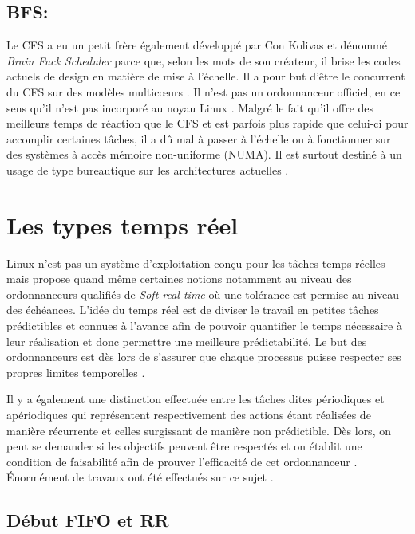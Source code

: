 \documentclass[letterpaper]{article}
\begin{document}
\subsection{BFS:}

Le CFS a eu un petit frère également développé par Con Kolivas et dénommé \textit{Brain Fuck Scheduler} parce que, selon les mots de son créateur, il brise les codes actuels de design en matière de mise à l'échelle. Il a pour but d'être le concurrent du CFS sur des modèles multicœurs \citep{PATCHBFS}. Il n'est pas un ordonnanceur officiel, en ce sens qu'il n'est pas incorporé au noyau Linux \citep{opac-b1133216}. Malgré le fait qu'il offre des meilleurs temps de réaction que le CFS et est parfois plus rapide que celui-ci pour accomplir certaines tâches, il a dû mal à passer à l'échelle ou à fonctionner sur des systèmes à accès mémoire non-uniforme (NUMA). Il est surtout destiné à un usage de type bureautique sur les architectures actuelles \citep{CFSVSBFS}.

\section{Les types temps réel}

Linux n'est pas un système d'exploitation conçu pour les tâches temps réelles mais propose quand même certaines notions notamment au niveau des ordonnanceurs qualifiés de \textit{Soft real-time} où une tolérance est permise au niveau des échéances. L'idée du temps réel est de diviser le travail en petites tâches prédictibles et connues à l'avance afin de pouvoir quantifier le temps nécessaire à leur réalisation et donc permettre une meilleure prédictabilité. Le but des ordonnanceurs est dès lors de s'assurer que chaque processus puisse respecter ses propres limites temporelles \citep{stankovic2012deadline}.

Il y a également une distinction effectuée entre les tâches dites périodiques et apériodiques qui représentent respectivement des actions étant réalisées de manière récurrente et celles surgissant de manière non prédictible. Dès lors, on peut se demander si les objectifs peuvent être respectés et on établit une condition de faisabilité afin de prouver l'efficacité de cet ordonnanceur \citep{128746}. Énormément de travaux ont été effectués sur ce sujet \citep{Sha:2004:RTS:1028913.1028959}.

\subsection{Début FIFO et RR}
\end{document}
